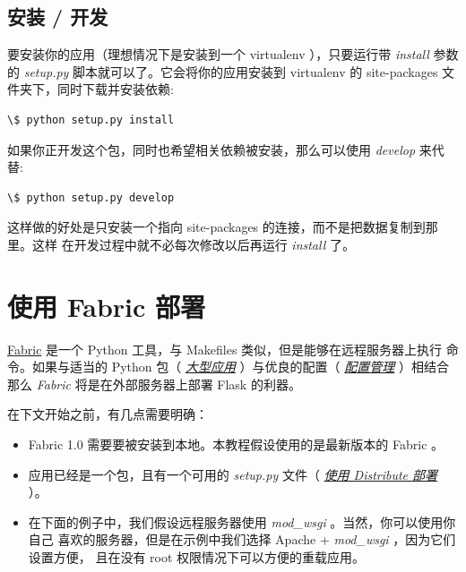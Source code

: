 \documentclass[a4paper,12pt]{sphinxmanual}
\begin{document}
\subsection{安装 / 开发}
\label{patterns/distribute:id4}
要安装你的应用（理想情况下是安装到一个 virtualenv ），只要运行带 \emph{install} 参数
的 \emph{setup.py} 脚本就可以了。它会将你的应用安装到 virtualenv 的 site-packages
文件夹下，同时下载并安装依赖:

\begin{Verbatim}[commandchars=\\\{\}]
\$ python setup.py install
\end{Verbatim}

如果你正开发这个包，同时也希望相关依赖被安装，那么可以使用 \emph{develop} 来代替:

\begin{Verbatim}[commandchars=\\\{\}]
\$ python setup.py develop
\end{Verbatim}

这样做的好处是只安装一个指向 site-packages 的连接，而不是把数据复制到那里。这样
在开发过程中就不必每次修改以后再运行 \emph{install} 了。


\section{使用 Fabric 部署}
\label{patterns/fabric:distribute-setup-py}\label{patterns/fabric:fabric-deployment}\label{patterns/fabric::doc}\label{patterns/fabric:fabric}
\href{http://fabfile.org/}{Fabric} 是一个 Python 工具，与 Makefiles 类似，但是能够在远程服务器上执行
命令。如果与适当的 Python 包（ {\hyperref[patterns/packages:larger-applications]{\emph{大型应用}}} ）与优良的配置（
{\hyperref[config:config]{\emph{配置管理}}} ）相结合那么 \emph{Fabric} 将是在外部服务器上部署 Flask 的利器。

在下文开始之前，有几点需要明确：
\begin{itemize}
\item {} 
Fabric 1.0 需要要被安装到本地。本教程假设使用的是最新版本的 Fabric 。

\item {} 
应用已经是一个包，且有一个可用的 \emph{setup.py} 文件（
{\hyperref[patterns/distribute:distribute-deployment]{\emph{使用 Distribute 部署}}} ）。

\item {} 
在下面的例子中，我们假设远程服务器使用 \emph{mod\_wsgi} 。当然，你可以使用你自己
喜欢的服务器，但是在示例中我们选择 Apache + \emph{mod\_wsgi} ，因为它们设置方便，
且在没有 root 权限情况下可以方便的重载应用。

\end{itemize}
\end{document}
